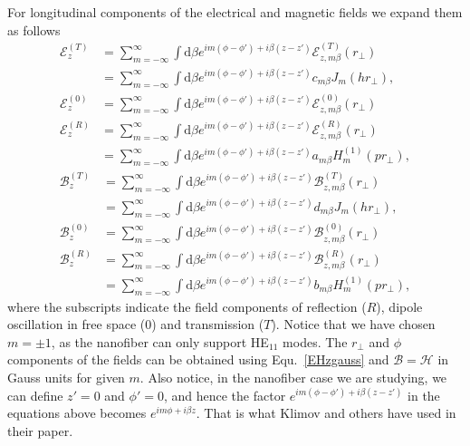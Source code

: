 \documentclass[]{report}
\begin{document}
For longitudinal components of the electrical and magnetic fields we expand them as follows
\begin{subequations}\label{ET0Rexpand}
\begin{align}
\mathcal{E}^{(T)}_z &= \sum_{m=-\infty}^\infty \int \mathrm{d}\beta e^{im(\phi-\phi') + i\beta (z-z')} \mathcal{E}^{(T)}_{z,m\beta}(r\!_\perp)\\
&= \sum_{m=-\infty}^\infty \int \mathrm{d}\beta e^{im(\phi-\phi') + i\beta (z-z')} c_{m\beta} J_m (hr\!_\perp),\\
\mathcal{E}^{(0)}_{z} &= \sum_{m=-\infty}^\infty \int \mathrm{d}\beta e^{im(\phi-\phi') + i\beta (z-z')} \mathcal{E}^{(0)}_{z,m\beta}(r\!_\perp)\\
\mathcal{E}^{(R)}_z &= \sum_{m=-\infty}^\infty \int \mathrm{d}\beta e^{im(\phi-\phi') + i\beta (z-z')} \mathcal{E}^{(R)}_{z,m\beta}(r\!_\perp)\\
&= \sum_{m=-\infty}^\infty \int \mathrm{d}\beta e^{im(\phi-\phi') + i\beta (z-z')} a_{m\beta} H_m^{(1)} (pr\!_\perp),
\end{align}
\end{subequations}
\begin{subequations}\label{BT0Rexpand}
\begin{align}
\mathcal{B}^{(T)}_z &= \sum_{m=-\infty}^\infty \int \mathrm{d}\beta e^{im(\phi-\phi') + i\beta (z-z')} \mathcal{B}^{(T)}_{z,m\beta}(r\!_\perp)\\
&= \sum_{m=-\infty}^\infty \int \mathrm{d}\beta e^{im(\phi-\phi') + i\beta (z-z')} d_{m\beta} J_m (hr\!_\perp),\\
\mathcal{B}^{(0)}_{z} &= \sum_{m=-\infty}^\infty \int \mathrm{d}\beta e^{im(\phi-\phi') + i\beta (z-z')} \mathcal{B}^{(0)}_{z,m\beta}(r\!_\perp)\\
\mathcal{B}^{(R)}_z &= \sum_{m=-\infty}^\infty \int \mathrm{d}\beta e^{im(\phi-\phi') + i\beta (z-z')} \mathcal{B}^{(R)}_{z,m\beta}(r\!_\perp)\\
&= \sum_{m=-\infty}^\infty \int \mathrm{d}\beta e^{im(\phi-\phi') + i\beta (z-z')} b_{m\beta} H_m^{(1)} (pr\!_\perp),
\end{align}
\end{subequations}
where the subscripts indicate the field components of reflection ($R$), dipole oscillation in free space ($0$) and transmission ($ T $). Notice that we have chosen $ m=\pm 1 $, as the nanofiber can only support HE$_{11}$ modes. 
The $ r\!_\perp $ and $ \phi $ components of the fields can be obtained using Equ.~\eqref{EHzgauss} and $ \mathcal{B}=\mathcal{H} $ in Gauss units for given $ m $. Also notice, in the nanofiber case we are studying, we can define $ z'=0 $ and $ \phi'=0 $, and hence the factor $ e^{im(\phi-\phi') + i\beta (z-z')} $ in the equations above becomes $ e^{im\phi + i\beta z} $. That is what Klimov and others have used in their paper.
\end{document}
